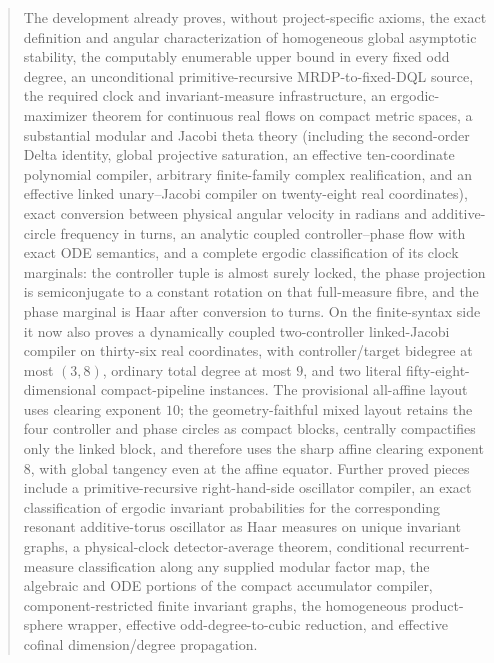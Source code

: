 \documentclass[11pt]{article}
\begin{document}
\begin{abstract}
The development already proves, without project-specific axioms, the exact
definition and angular characterization of homogeneous global asymptotic
stability, the computably enumerable upper bound in every fixed odd degree,
an unconditional primitive-recursive MRDP-to-fixed-DQL source, the required
clock and invariant-measure infrastructure, an ergodic-maximizer theorem for
continuous real flows on compact metric spaces, a substantial modular and
Jacobi theta theory (including the second-order Delta identity, global
projective saturation, an effective ten-coordinate polynomial compiler,
arbitrary finite-family complex realification, and an effective linked
unary--Jacobi compiler on twenty-eight real coordinates), exact conversion
between physical angular velocity in radians and additive-circle frequency
in turns, an analytic coupled controller--phase flow with exact ODE
semantics, and a complete ergodic classification of its clock marginals:
the controller tuple is almost surely locked, the phase projection is
semiconjugate to a constant rotation on that full-measure fibre, and the
phase marginal is Haar after conversion to turns.
On the finite-syntax side it now also proves a dynamically coupled
two-controller linked-Jacobi compiler on thirty-six real coordinates, with
controller/target bidegree at most \((3,8)\), ordinary total degree at most
\(9\), and two literal fifty-eight-dimensional compact-pipeline instances.
The provisional all-affine layout uses clearing exponent \(10\); the
geometry-faithful mixed layout retains the four controller and phase
circles as compact blocks, centrally compactifies only the linked block,
and therefore uses the sharp affine clearing exponent \(8\), with global
tangency even at the affine equator.  Further proved pieces include a
primitive-recursive right-hand-side oscillator compiler, an exact
classification of ergodic invariant probabilities for the corresponding
resonant additive-torus oscillator as Haar measures on unique invariant
graphs, a physical-clock detector-average theorem, conditional
recurrent-measure classification along any supplied modular factor map, the
algebraic and ODE portions of the compact accumulator compiler,
component-restricted finite invariant graphs, the homogeneous product-sphere
wrapper, effective odd-degree-to-cubic reduction, and effective cofinal
dimension/degree propagation.


\end{abstract}
\end{document}
